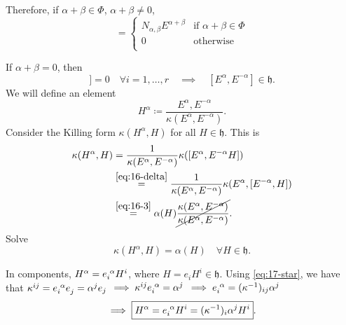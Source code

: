 Therefore, if $\alpha + \beta \in \Phi$, $\alpha + \beta \neq 0$,
 \begin{equation}
   [E^{\alpha} E^{\beta}] =
   \begin{cases}
     N_{\alpha, \beta} E^{\alpha + \beta} & \text{if } \alpha + \beta \in \Phi \\
     0 & \text{otherwise} \\
   \end{cases}
\end{equation}

If $\alpha + \beta = 0$, then
 \begin{equation}
   [H^{i}, [E^{\alpha} , E^{-a}]]  =0 \quad \forall i = 1, \dots, r \quad\implies\quad [E^{\alpha} , E^{-\alpha}] \in \mathfrak{h}.
\end{equation}
We will define an element
\begin{equation}
  H^{\alpha} \coloneqq \frac{E^{\alpha} , E^{-\alpha}}{\kappa ( E^{\alpha} , E^{-\alpha})}.
\end{equation}
Consider the Killing form $\kappa(H^{\alpha} , H)$ for all $H \in \mathfrak{h}$. This is
\begin{align}
  \kappa(H^{\alpha} , H) &= \frac{1}{\kappa(E^{\alpha} , E^{-\alpha})} \kappa([E^{\alpha} , E^{-\alpha} H]) \\
			 &\stackrel{\eqref{eq:16-delta}}{=} \frac{1}{\kappa(E^{\alpha}, E^{-\alpha})} \kappa (E^{\alpha}, [E^{-\alpha}, H]) \\
			 &\stackrel{\eqref{eq:16-3}}{=} \alpha(H) \cancel{\frac{\kappa(E^{\alpha}, E^{-\alpha})}{\kappa(E^{\alpha}, E^{-\alpha})}}.
\end{align}
Solve
\begin{equation}
  \label{eq:17-star}
  \kappa(H^{\alpha}, H) = \alpha(H) \quad \forall H \in \mathfrak{h}.
\end{equation}

In components, $H^{\alpha} = e\indices{_{i}^{\alpha}} H^{i}$, where $H = e_{i} H^{i} \in \mathfrak{h}$.
Using \eqref{eq:17-star}, we have that $\kappa^{ij} = e\indices{_{i}^{\alpha}} e\indices{_{j}} = \alpha^{j} e_{j}$ $\implies \kappa^{ij} e\indices{_{i}^{\alpha}}  = \alpha^{j}$ $\implies e\indices{_{i}^{\alpha}} = (\kappa^{-1})_{ij} \alpha^{j}$
\begin{equation}
  \label{eq:17-7}
  \implies \boxed{H^{\alpha} = e\indices{_{i}^{\alpha}} H^{i} = (\kappa^{-1})_{i} \alpha^{j} H^{i}}.
\end{equation}

